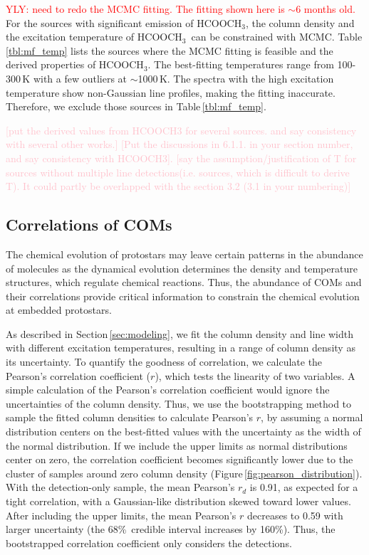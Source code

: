 \documentclass[twocolumn]{aastex62}
\newcommand{\methylformate}{\mbox{HCOOCH$_{3}$}}
\begin{document}
\textcolor{red}{YLY: need to redo the MCMC fitting.  The fitting shown here is $\sim$6 months old.}  For the sources with significant emission of \methylformate, the column density and the excitation temperature of \methylformate\ can be constrained with MCMC.  Table\,\ref{tbl:mf_temp} lists the sources where the MCMC fitting is feasible and the derived properties of \methylformate.  The best-fitting temperatures range from 100-300\,K with a few outliers at $\sim$1000\,K.  The spectra with the high excitation temperature show non-Gaussian line profiles, making the fitting inaccurate.  Therefore, we exclude those sources in Table\,\ref{tbl:mf_temp}.



\textcolor{pink}{[put the derived values from HCOOCH3 for several sources. and say consistency with several other works.]
[Put the discussions in 6.1.1. in your section number, and say consistency with HCOOCH3].
[say the assumption/justification of T for sources without multiple line detections(i.e. sources, which is difficult to derive T).  It could partly be overlapped with the section 3.2 (3.1 in your numbering)]}

\subsection{Correlations of COMs}
The chemical evolution of protostars may leave certain patterns in the abundance of molecules as the dynamical evolution determines the density and temperature structures, which regulate chemical reactions.  Thus, the abundance of COMs and their correlations provide critical information to constrain the chemical evolution at embedded protostars.

As described in Section\,\ref{sec:modeling}, we fit the column density and line width with different excitation temperatures, resulting in a range of column density as its uncertainty.  
To quantify the goodness of correlation, we calculate the Pearson's correlation coefficient ($r$), which tests the linearity of two variables.  A simple calculation of the Pearson's correlation coefficient would ignore the uncertainties of the column density.  Thus, we use the bootstrapping method to sample the fitted column densities to calculate Pearson's $r$, by assuming a normal distribution centers on the best-fitted values with the uncertainty as the width of the normal distribution.  If we include the upper limits as normal distributions center on zero, the correlation coefficient becomes significantly lower due to the cluster of samples around zero column density (Figure\,\ref{fig:pearson_distribution}).  With the detection-only sample, the mean Pearson's $r_{d}$ is 0.91, as expected for a tight correlation, with a Gaussian-like distribution skewed toward lower values.  After including the upper limits, the mean Pearson's $r$ decreases to 0.59 with larger uncertainty (the 68\%\ credible interval increases by 160\%).  Thus, the bootstrapped correlation coefficient only considers the detections.
\end{document}
